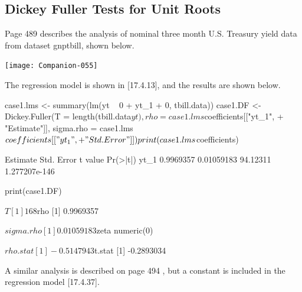 \documentclass[a4paper]{article}
\begin{document}
\subsection{Dickey Fuller Tests for Unit Roots}
Page 489 describes the analysis of nominal
three month U.S. Treasury
yield data from
dataset gnptbill, shown below.
\begin{Schunk}
\end{Schunk}
\begin{center}
\texttt{[image: Companion-055]}
\end{center}
The regression model is shown in [17.4.13], and the results are shown below.
\begin{Schunk}
\begin{Sinput}
 case1.lms <- summary(lm(yt ~ 0 + yt_1 + 0, tbill.data))
 case1.DF <- Dickey.Fuller(T = length(tbill.data$yt), rho = case1.lms$coefficients[["yt_1", 
+     "Estimate"]], sigma.rho = case1.lms$coefficients[["yt_1", 
+     "Std. Error"]])
 print(case1.lms$coefficients)
\end{Sinput}
\begin{Soutput}
      Estimate Std. Error  t value      Pr(>|t|)
yt_1 0.9969357 0.01059183 94.12311 1.277207e-146
\end{Soutput}
\begin{Sinput}
 print(case1.DF)
\end{Sinput}
\begin{Soutput}
$T
[1] 168

$rho
[1] 0.9969357

$sigma.rho
[1] 0.01059183

$zeta
numeric(0)

$rho.stat
[1] -0.5147943

$t.stat
[1] -0.2893034
\end{Soutput}
\end{Schunk}
A similar analysis is described on page 494 , but a constant is included in the regression model [17.4.37].
\end{document}
